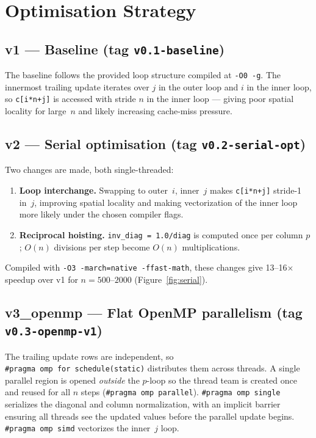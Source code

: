 \documentclass{article}
\begin{document}
\section{Optimisation Strategy}

\subsection{v1 --- Baseline (tag \texttt{v0.1-baseline})}

The baseline follows the provided loop structure compiled at \texttt{-O0 -g}.
The innermost trailing update iterates over $j$ in the outer loop and $i$ in
the inner loop, so \texttt{c[i*n+j]} is accessed with stride $n$ in the inner
loop --- giving poor spatial locality for large~$n$ and likely increasing
cache-miss pressure.

\subsection{v2 --- Serial optimisation (tag \texttt{v0.2-serial-opt})}

Two changes are made, both single-threaded:
\begin{enumerate}
  \item \textbf{Loop interchange.}
    Swapping to outer~$i$, inner~$j$ makes \texttt{c[i*n+j]} stride-1 in~$j$,
    improving spatial locality and making vectorization of the inner loop more
    likely under the chosen compiler flags.
  \item \textbf{Reciprocal hoisting.}
    \texttt{inv\_diag = 1.0/diag} is computed once per column $p$;
    $O(n)$ divisions per step become $O(n)$ multiplications.
\end{enumerate}
Compiled with \texttt{-O3 -march=native -ffast-math}, these changes give
13--16$\times$ speedup over v1 for $n = 500$--$2000$ (Figure~\ref{fig:serial}).

\subsection{v3\_openmp --- Flat OpenMP parallelism (tag \texttt{v0.3-openmp-v1})}

The trailing update rows are independent, so \texttt{\#pragma~omp~for~schedule(static)}
distributes them across threads.
A single parallel region is opened \emph{outside} the $p$-loop so the thread
team is created once and reused for all $n$ steps (\texttt{\#pragma~omp~parallel}).
\texttt{\#pragma~omp~single} serializes the diagonal and column normalization,
with an implicit barrier ensuring all threads see the updated values before the
parallel update begins.
\texttt{\#pragma~omp~simd} vectorizes the inner~$j$ loop.
\end{document}
